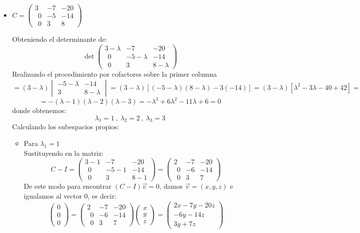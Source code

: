 \begin{itemize}
    
   
   
   
   
   
    
    \item $C=\begin{pmatrix}3&-7&-20\\ \:\:0&-5&-14\\ \:\:0&3&8\end{pmatrix} $
    
    Obteniendo el determinante de:
    $$\det \begin{pmatrix}3-\lambda&-7&-20\\ \:\:0&-5-\lambda&-14\\ \:\:0&3&8-\lambda\end{pmatrix}$$
    Realizando el procedimiento por cofactores sobre la primer columna
    $$=(3-\lambda)\begin{vmatrix}-5-\lambda&-14\\ 3&8-\lambda\end{vmatrix}=(3-\lambda)[(-5-\lambda)(8-\lambda)-3(-14)]=(3-\lambda)[\lambda^2-3\lambda-40+42]=(3-\lambda)(\lambda^2-3\lambda+2)$$$$=-(\lambda-1)(\lambda-2)(\lambda-3)=-\lambda^3+6\lambda^2-11\lambda+6=0$$
    donde obtenemos:
    $$\lambda_1=1~,~\lambda_2=2~,~\lambda_3=3$$
    Calculando los subespacios propios:
    \begin{itemize}
        \item Para $\lambda_1=1$\\
        Sustituyendo en la matriz:
        \[C-I=\begin{pmatrix}3-1&-7&-20\\ \:\:0&-5-1&-14\\ \:\:0&3&8-1\end{pmatrix}=\begin{pmatrix}2&-7&-20\\ \:\:0&-6&-14\\ \:\:0&3&7\end{pmatrix}\]
        De este modo para encontrar $(C-I)\Vec{v}=0$, damos $\vec{v}=(x,y,z)$ e igualamos al vector 0, es decir:
        \[\begin{pmatrix}0\\0\\0\end{pmatrix}=\begin{pmatrix}2&-7&-20\\ \:\:0&-6&-14\\ \:\:0&3&7\end{pmatrix}\begin{pmatrix}x\\y\\z\end{pmatrix}=\begin{pmatrix}2x-7y-20z\\-6y-14z\\3y+7z\end{pmatrix}\]

\end{itemize}
\end{itemize}
